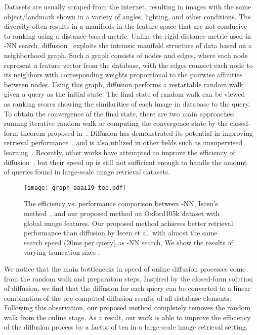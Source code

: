 \documentclass[letterpaper]{article} \usepackage{aaai19}  \usepackage{times}  \usepackage{helvet}  \usepackage{courier}  \usepackage{url}  \usepackage{graphicx}  \frenchspacing  \setlength{\pdfpagewidth}{8.5in}  \setlength{\pdfpageheight}{11in}
\begin{document}
Datasets are usually scraped from the internet, resulting in images with the same object/landmark shown in a variety of angles, lighting, and other conditions.
The diversity often results in a manifolds in the feature space that are not conducive to ranking using a distance-based metric.
Unlike the rigid distance metric used in -NN search, diffusion~\cite{zhou2004ranking,zhou2004learning,donoser2013diffusion,grady2006random} exploits the intrinsic manifold structure of data based on a neighborhood graph.
Such a graph consists of nodes and edges, where each node represent a feature vector from the database, with the edges connect each node to its neighbors with corresponding weights proportional to the pairwise affinities between nodes.
Using this graph, diffusion performs a restartable random walk given a query as the initial state.
The final state of random walk can be viewed as ranking scores showing the similarities of each image in database to the query.
To obtain the convergence of the final state, there are two main approaches: running iterative random walk or computing the convergence state by the closed-form theorem proposed in~\cite{zhou2004ranking}.
Diffusion has demonstrated its potential in improving retrieval performance~\cite{donoser2013diffusion,iscen2017efficient,radenovic2018revisiting}, and is also utilized in other fields such as unsupervised learning~\cite{iscen2018mining}.
Recently, other works have attempted to improve the efficiency of diffusion~\cite{iscen2017efficient}, but their speed up is still not sufficient enough to handle the amount of queries found in large-scale image retrieval datasets.


\begin{figure}[t!]
  \centering
  \texttt{[image: graph\_aaai19\_top.pdf]}
  \caption{The efficiency vs. performance comparison between -NN, Iscen's method~\cite{iscen2017efficient}, and our proposed method on Oxford105k dataset with global image features. 
  Our proposed method achieves better retrieval performance than diffusion by Iscen et al. with almost the same search speed (20ms per query) as -NN search. We show the results of varying truncation sizes .}
  \label{fig:top}
\vspace{-4mm}
\end{figure}

We notice that the main bottlenecks in speed of online diffusion processes come from the random walk and preparation steps.
Inspired by the closed-form solution of diffusion, we find that the diffusion for each query can be converted to a linear combination of the pre-computed diffusion results of all database elements.
Following this observation, our proposed method completely removes the random walk from the online stage.
As a result, our work is able to improve the efficiency of the diffusion process by a factor of ten in a large-scale image retrieval setting.
\end{document}
